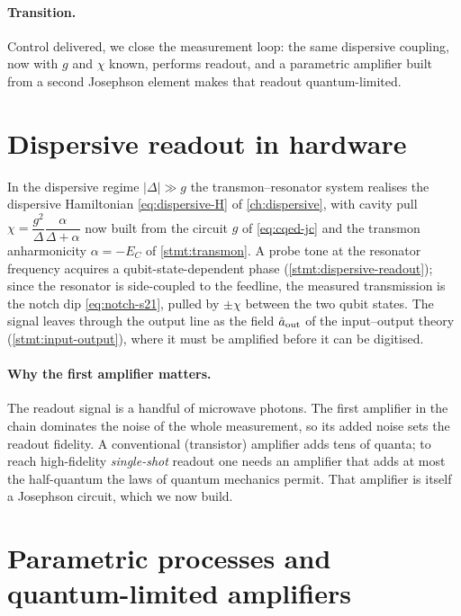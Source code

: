 \paragraph{Transition.}
Control delivered, we close the measurement loop: the same dispersive
coupling, now with $g$ and $\chi$ known, performs readout, and a
parametric amplifier built from a second Josephson element makes that
readout quantum-limited.

\section{Dispersive readout in hardware}
\label{sec:cqed-readout}

\begin{statement}
\label{stmt:cqed-readout}
In the dispersive regime $|\Delta|\gg g$ the transmon--resonator system
realises the dispersive Hamiltonian \cref{eq:dispersive-H} of
\cref{ch:dispersive}, with cavity pull
$\chi=\dfrac{g^2}{\Delta}\dfrac{\alpha}{\Delta+\alpha}$ now built from
the circuit $g$ of \cref{eq:cqed-jc} and the transmon anharmonicity
$\alpha=-E_C$ of \cref{stmt:transmon}. A probe tone at the resonator
frequency acquires a qubit-state-dependent phase
(\cref{stmt:dispersive-readout}); since the resonator is side-coupled
to the feedline, the measured transmission is the notch dip
\cref{eq:notch-s21}, pulled by $\pm\chi$ between the two qubit states.
The signal leaves through the output line as the field $\hat a_{\rm out}$
of the input--output theory (\cref{stmt:input-output}), where it must be
amplified before it can be digitised.
\end{statement}

\paragraph{Why the first amplifier matters.}
The readout signal is a handful of microwave photons. The first
amplifier in the chain dominates the noise of the whole measurement, so
its added noise sets the readout fidelity. A conventional
(transistor) amplifier adds tens of quanta; to reach high-fidelity
\emph{single-shot} readout one needs an amplifier that adds at most the
half-quantum the laws of quantum mechanics permit. That amplifier is
itself a Josephson circuit, which we now build.

\section{Parametric processes and quantum-limited amplifiers}
\label{sec:parametric}

